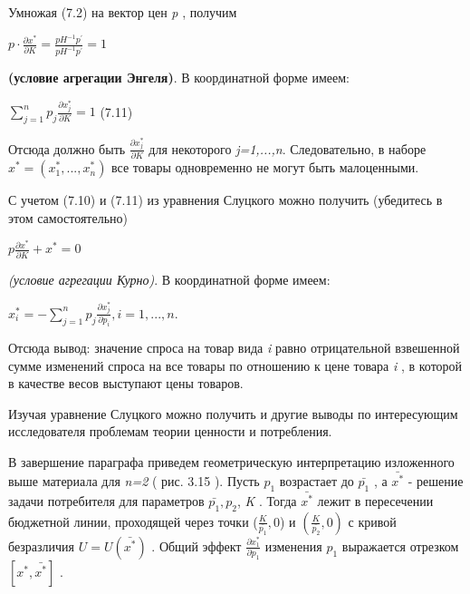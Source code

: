 \documentclass[12pt, 4paper]{book}
\begin{document}
{Умножая (7.2) на вектор цен \textit{p} , получим 
\begin{center}
$p \cdot \frac{\partial x^{*}}{\partial K}=\frac{p H^{-1}p^{'}}{p H^{-1}p^{'}}=1$
\end{center}
\textbf{(условие агрегации Энгеля)}. В координатной форме имеем: 
\begin{center}
$\sum\limits_{j=1}^{n}p_j \frac{\partial x_{j}^{*}}{\partial K}=1$ (7.11)
\end{center}
\par

Отсюда должно быть $\frac{\partial x_{j}^{*}}{\partial K}$  для некоторого \textit{j=1,...,n}. Следовательно, в наборе $x^{*}=(x_{1}^{*},...,x_{n}^{*})$ все товары одновременно не могут быть малоценными. 
\par

С учетом (7.10) и (7.11) из уравнения Слуцкого можно получить (убедитесь в этом самостоятельно)
\begin{center}
$p\frac{\partial x^{*}}{\partial K}+ x^{*}=0$
\end{center}
\textit{(условие агрегации Курно)}. В координатной форме имеем: 
\begin{center}
$x_{i}^{*}=-\sum\limits_{j=1}^{n}p_j \frac{\partial x_{j}^{*}}{\partial p_i},i=1,...,n.$
\end{center}
\par

Отсюда вывод: значение спроса на товар вида \textit{i} равно отрицательной взвешенной сумме изменений спроса на все товары по отношению к цене товара \textit{i} , в которой в качестве весов выступают цены товаров. 
\par

Изучая уравнение Слуцкого можно получить и другие выводы по интересующим исследователя проблемам теории ценности и потребления. 
\par

В завершение параграфа приведем геометрическую интерпретацию изложенного выше материала для \textit{n=2} ( рис. 3.15 ). Пусть $p_1$ возрастает до $\bar{p_1}$ , а $\bar{x^{*}}$ - решение задачи потребителя для параметров $\bar{p_1},p_2$, \textit{K} . Тогда $\bar{x^{*}}$ лежит в пересечении бюджетной линии, проходящей через точки ($\frac{K}{\bar{p_1}},0$) и $(\frac{K}{\bar{p_2}},0)$ с кривой безразличия $U=U(\bar{x^{*}})$ . Общий эффект $\frac{\partial x_{1}^{*}}{\partial p_1}$ изменения $p_1$ выражается отрезком $[x^{*},\bar{x^{*}}]$ . 
\par

}
\end{document}
